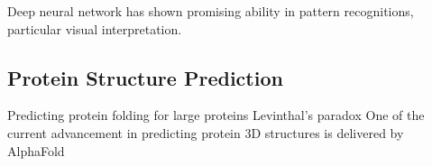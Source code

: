 Deep neural network has shown promising ability in pattern recognitions, particular visual interpretation.
\par 

\subsection{Protein Structure Prediction}
Predicting protein folding for large proteins  Levinthal's paradox One of the current advancement in predicting protein 3D structures is delivered by AlphaFold
